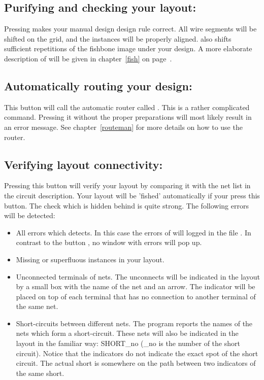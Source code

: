 \subsection{Purifying and checking your layout: \protect{}}
\label{fish1}
Pressing  makes your manual design design rule correct.
All wire segments will be shifted on the grid, and the instances will
be properly aligned.  also shifts sufficient repetitions of
the fishbone image under your design.  A more elaborate description of
 will be given in chapter~\ref{fish} on page~\pageref{fish}.

\subsection{Automatically routing your design: \protect{}}
This button will call the automatic router called .
This is a rather complicated command. Pressing it without the
proper preparations will most likely result in an error message.
See chapter~\ref{routeman} for more details on how to use the router.

\subsection{Verifying layout connectivity: \protect{}}
\label{verify}
Pressing this button will verify your layout by comparing it with the
net list in the circuit description. Your layout will be 'fished'
automatically if your press this button.  The check which is hidden
behind  is quite strong. The following errors will
be detected:
\begin{itemize}
\item
All errors which  detects. In this case the errors of
 will logged in the file . In contrast to 
the button , no window with errors will pop up.
\item
Missing or superfluous instances in your layout. 
\item
Unconnected terminals of nets. The unconnects will be indicated in the
layout by a small box with the name of the net and an arrow.
The indicator will be placed on top of each terminal that has no
connection to another terminal of the same net.
\item
Short-circuits between different nets.  The program reports the names
of the nets which form a short-circuit.  These nets will also be
indicated in the layout in the familiar way: {\sf SHORT\_no} (\_no
is the number of the short circuit).  Notice that the indicators do not
indicate the exact spot of the short circuit. The actual short is
somewhere on the path between two indicators of the same short.
\end{itemize}


